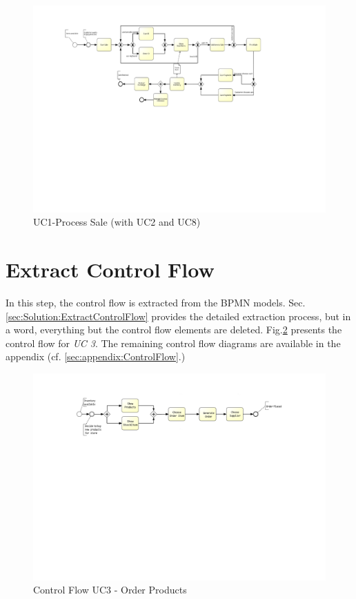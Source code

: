 \begin{figure}[h!]
	\centering
	\includegraphics[width=\textwidth, trim={4cm 10.5cm 8cm 2cm}]{img/UC1.pdf}
	\caption{UC1-Process Sale (with UC2 and UC8)}
	\label{fig:UC1}
\end{figure}




\section{Extract Control Flow}

In this step, the control flow is extracted from the BPMN models. Sec. \ref{sec:Solution:ExtractControlFlow} provides the detailed extraction process, but in a word, everything but the control flow elements are deleted. Fig.\ref{fig:UC3Control} presents the control flow for \textit{UC 3}. The remaining control flow diagrams are available in the appendix (cf. \ref{sec:appendix:ControlFlow}.)

\begin{figure}[h!]
	\centering
	\includegraphics[width=\textwidth, trim={5cm 14cm 6cm 2cm}]{img/UC3Control.pdf}
	\caption{Control Flow UC3 - Order Products}
	\label{fig:UC3Control}
\end{figure}

